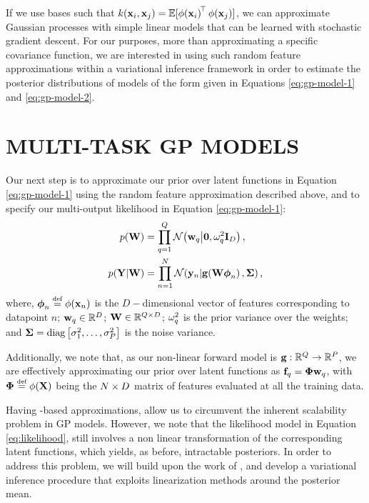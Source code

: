 If we use \rks bases  such that
$k\!\left({{\mathbf{x}_i}, {\mathbf{x}_j}}\right) = 
\mathbb{E}[\phi\!\left({{\mathbf{x}_i}}\right)^{\!\top}\phi\!\left({{\mathbf{x}_j}}\right)]$, we can
approximate Gaussian processes with simple linear models that can
be learned with stochastic gradient descent. 
For our purposes, more than approximating a specific covariance function, we are 
interested in using such random feature approximations within a variational inference 
framework in order to estimate the posterior distributions of models of the form given
in Equations \eqref{eq:gp-model-1} and \eqref{eq:gp-model-2}. 
%
\section{MULTI-TASK GP MODELS}
 Our next step is to approximate our prior over latent functions in Equation \eqref{eq:gp-model-1} 
 using the random feature approximation described above, and to specify 
 our multi-output likelihood in Equation \eqref{eq:gp-model-1}:
 \begin{align}
 \label{eq:prior}
 p(\mathbf{W}) &=  \prod^Q_{q=1} \mathcal{N}\!\left({\mathbf{w}_q}\middle\vert{\mathbf{0}, \ensuremath{\omega^2}_q \ensuremath{\mathbf{I}_{D}}}\right) \text{,} \\
  \label{eq:likelihood}
    p\!\left({\mathbf{Y} }\middle\vert{\ensuremath{\mathbf{W}}}\right) &=
        \prod^N_{n=1} \mathcal{N}\!\left({\mathbf{y}_n}\middle\vert{\ensuremath{\mathbf{g}\!\left({{\mathbf{W}\boldsymbol\phi_n}}\right)}, \ensuremath{\mathbf{\Sigma}}}\right)  \text{,}
\end{align}
%
where,  $\feats_n \defeq \featfunc{\ins_n}$  is the 
 $D-$dimensional vector of features corresponding to datapoint $n$; 
$\mathbf{w}_q \in \mathbb{R}^{D}$;
 $\mathbf{W} \in \mathbb{R}^{Q   \times D}$;
$\omega^2_q$ is the prior variance over the weights; 
 and $\mathbf{\Sigma} = \operatorname{diag}{\left[{\sigma^2_1, \ldots, \sigma^2_P}\right]}$ is the  
 noise variance. 
 
Additionally, we note that, as our non-linear
forward model  is $\mathbf{g} : \mathbb{R}^{Q} \to \mathbb{R}^{P}$,  
we are effectively  approximating our prior over latent functions as 
 $\mathbf{f}_q = \boldsymbol\Phi\mathbf{w}_q$, with  $\Feats \defeq \featfunc{\Ins}$
 being the $N \times D$  matrix of features evaluated at all the training data. 
 
Having \rks-based approximations, allow us to circumvent the inherent
scalability problem in GP models. However, we note that the likelihood model 
in Equation  \eqref{eq:likelihood}, still involves a non linear transformation 
of the corresponding latent functions, which yields, as before, intractable posteriors. 
In order to address this problem, we will build upon the work of 
\cite{steinberg-bonilla-nips-2014}, and develop a variational inference procedure 
that exploits linearization methods around the posterior mean.



